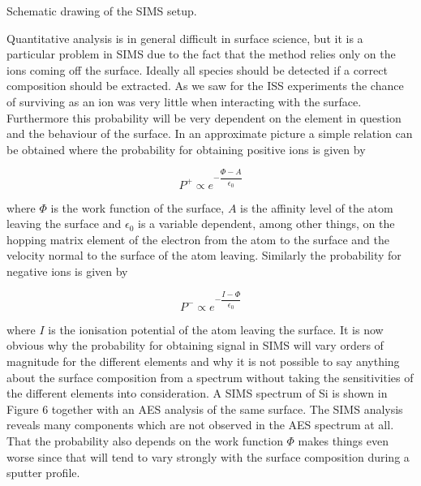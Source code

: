 \vspace*{11cm}

 Schematic drawing of the SIMS setup.

\vspace{1cm}

Quantitative analysis is in general difficult in surface science, but it is a particular problem in SIMS due to the fact that the method relies only on the ions coming off the surface. Ideally all species should be detected if a correct composition should be extracted. As we saw for the ISS experiments the chance of surviving as an ion was very little when interacting with the surface. Furthermore this probability will be very dependent on the element in question and the behaviour of the surface. In an approximate picture a simple relation can be obtained \cite{Norskovlang} where the probability for obtaining positive ions is given by

\begin{equation}
P^+\propto e^{-\dfrac{\Phi-A}{\epsilon_0}} 
\end{equation}

\noindent where $\Phi$ is the work function of the surface, $A$ is the affinity level of the atom leaving the surface and $\epsilon_0$ is a variable dependent, among other things, on the hopping matrix element of the electron from the atom to the surface and the velocity normal to the surface of the atom leaving. Similarly the probability for negative ions is given by

\begin{equation}
P^-\propto e^{-\dfrac{I-\Phi}{\epsilon_0}} 
\end{equation}

\noindent where $I$ is the ionisation potential of the atom leaving the surface. It is now obvious why the probability for obtaining signal in SIMS will vary orders of magnitude for the different elements and why it is not possible to say anything about the surface composition from a spectrum without taking the sensitivities of the different elements into consideration.  A SIMS spectrum of Si is shown in Figure 6 together with an AES analysis of the same surface. The SIMS analysis reveals many components which are not observed in the AES spectrum at all. That the probability also depends on the work function $\Phi$ makes things even worse since that will tend to vary strongly with the surface composition during a sputter profile.

\vspace*{16cm}

